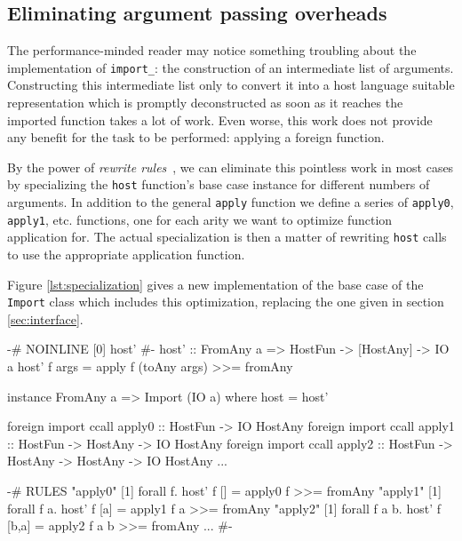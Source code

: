 \documentclass[preprint]{sigplanconf}
\begin{document}
\subsection{Eliminating argument passing overheads}
\label{sec:specialization}
The performance-minded reader may notice something troubling about the
implementation of \lstinline!import_!: the construction of an intermediate list
of arguments. Constructing this intermediate list only to convert it into a
host language suitable representation which is promptly deconstructed as soon
as it reaches the imported function takes a lot of work. Even worse, this work
does not provide any benefit for the task to be performed: applying a foreign
function.

By the power of \emph{rewrite rules}\ \cite{rewriterules}, we can
eliminate this pointless work in most cases by specializing the
\lstinline!host! function's base case instance for different numbers of
arguments.
In addition to the general \lstinline!apply! function we define a series of
\lstinline!apply0!, \lstinline!apply1!, etc. functions, one for each arity
we want to optimize function application for.
The actual specialization is then a matter of
rewriting \lstinline!host! calls to use the appropriate application function.

Figure \ref{lst:specialization} gives a new implementation of the base case
of the \lstinline!Import! class which includes this optimization, replacing
the one given in section \ref{sec:interface}.

\begin{listingfloat}
\begin{code}
  {-# NOINLINE [0] host' #-}
  host' :: FromAny a => HostFun -> [HostAny] -> IO a
  host' f args = apply f (toAny args) >>= fromAny

  instance FromAny a => Import (IO a) where
    host = host'
  
  foreign import ccall apply0 ::
    HostFun -> IO HostAny
  foreign import ccall apply1 ::
    HostFun -> HostAny -> IO HostAny
  foreign import ccall apply2 ::
    HostFun -> HostAny -> HostAny -> IO HostAny
  ...
  
  {-# RULES
    "apply0" [1] forall f. host' f [] =
                 apply0 f >>= fromAny
    "apply1" [1] forall f a. host' f [a] =
                 apply1 f a >>= fromAny
    "apply2" [1] forall f a b. host' f [b,a] =
                 apply2 f a b >>= fromAny
    ...
   #- }
\end{code}
\caption{Specializing the \lstinline!host! base case}
\label{lst:specialization}
\end{listingfloat}
\end{document}
